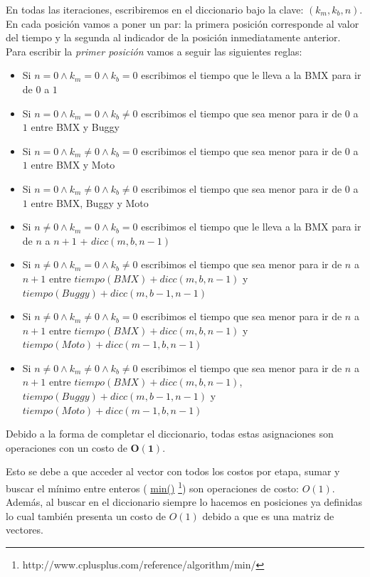 En todas las iteraciones, escribiremos en el diccionario bajo la clave:  $(k{_m}, k{_b}, n)$. En cada posici\'on vamos a poner un par: la primera posici\'on corresponde al valor del tiempo y la segunda al indicador de la posici\'on inmediatamente anterior.\\

Para escribir la \emph{primer posici\'on} vamos a seguir las siguientes reglas:

\begin{itemize}
\item Si $n=0 \wedge k_m=0 \wedge k_b=0$ escribimos el tiempo que le lleva a la BMX para ir de $0$ a $1$
\item Si $n=0 \wedge k_m=0 \wedge k_b\neq0$ escribimos el tiempo que sea menor para ir  de $0$ a $1$ entre BMX y Buggy
\item Si $n=0 \wedge k_m\neq0 \wedge k_b=0$ escribimos el tiempo que sea menor para ir  de $0$ a $1$ entre BMX y Moto
\item Si $n=0 \wedge k_m\neq0 \wedge k_b\neq0$ escribimos el tiempo que sea menor para ir  de $0$ a $1$ entre BMX, Buggy y Moto
\item Si $n\neq0 \wedge k_m=0 \wedge k_b=0$ escribimos el tiempo que le lleva a la BMX para ir de $n$ a $n+1$ + $dicc(m, b, n-1)$
\item Si $n\neq0 \wedge k_m=0 \wedge k_b\neq0$ escribimos el tiempo que sea menor para ir  de $n$ a $n+1$ entre $tiempo(BMX) + dicc(m, b, n-1)$ y $tiempo(Buggy) + dicc(m, b-1, n-1)$
\item Si $n\neq0 \wedge k_m\neq0 \wedge k_b=0$ escribimos el tiempo que sea menor para ir  de $n$ a $n+1$ entre $tiempo(BMX) + dicc(m, b, n-1)$ y $tiempo(Moto) + dicc(m-1, b, n-1)$
\item Si $n\neq0 \wedge k_m\neq0 \wedge k_b\neq0$ escribimos el tiempo que sea menor para ir  de $n$ a $n+1$ entre $tiempo(BMX) + dicc(m, b, n-1)$, $tiempo(Buggy) + dicc(m, b-1, n-1)$ y $tiempo(Moto) + dicc(m-1, b, n-1)$
\end{itemize}

Debido a la forma de completar el diccionario, todas estas asignaciones son operaciones con un costo de $\mathbf{O(1)}$. 

Esto se debe a que acceder al vector con todos los costos por etapa, sumar y buscar el m\'inimo entre enteros ( \href{http://www.cplusplus.com/reference/algorithm/min/}{min()} \footnote{http://www.cplusplus.com/reference/algorithm/min/}) son operaciones de costo: $O(1)$. Adem\'as, al buscar en el diccionario siempre lo hacemos en posiciones ya definidas lo cual tambi\'en presenta un costo de $O(1)$ debido a que es una matriz de vectores.\\

